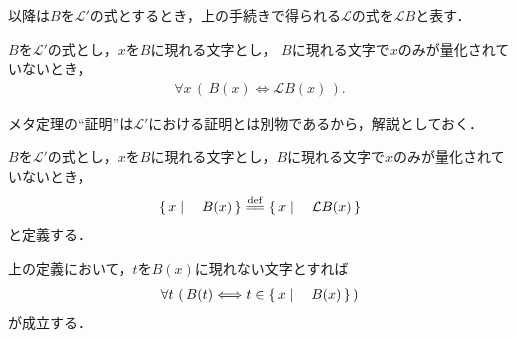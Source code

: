 	以降は$B$を$\mathcal{L}'$の式とするとき，上の手続きで得られる$\mathcal{L}$の式を$\mathcal{L}B$と表す．
	
	\begin{screen}
		\begin{metathm}[式の書き換えの同値性]\label{metathm:rewritten_formula_is_equivalent}
			$B$を$\mathcal{L}'$の式とし，$x$を$B$に現れる文字とし，
			$B$に現れる文字で$x$のみが量化されていないとき，
			\begin{align}
				\forall x\, \left(\, B(x) \Longleftrightarrow \mathcal{L}B(x)\, \right).
			\end{align}
		\end{metathm}
	\end{screen}
	
	メタ定理の``証明''は$\mathcal{L}'$における証明とは別物であるから，解説としておく．
	
	
	\begin{screen}
		\begin{dfn}
			$B$を$\mathcal{L}'$の式とし，$x$を$B$に現れる文字とし，$B$に現れる文字で$x$のみが量化されていないとき，
			\begin{align}
				\Set{x}{B(x)} \defeq \Set{x}{\mathcal{L}B(x)}
			\end{align}
			と定義する．
		\end{dfn}
	\end{screen}
	
	上の定義において，$t$を$B(x)$に現れない文字とすれば
	\begin{align}
		\forall t\, \left(\, B(t) \Longleftrightarrow t \in \left\{\, x \mid \quad B(x)\, \right\}\, \right)
	\end{align}
	が成立する．
	